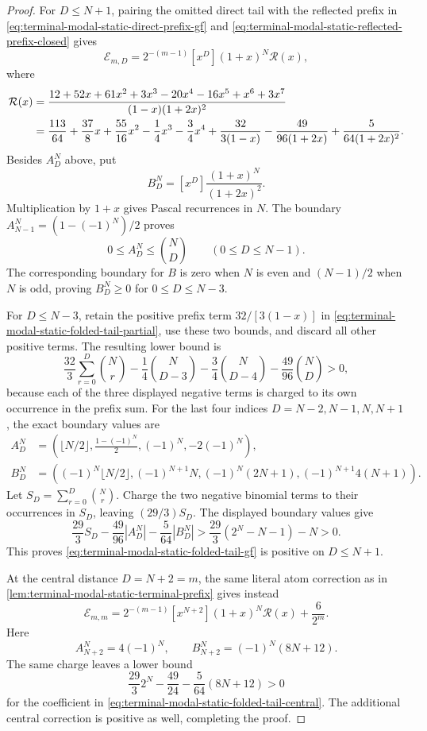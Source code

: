 \begin{proof}
For $D\le N+1$, pairing the omitted direct tail with the reflected prefix in
\eqref{eq:terminal-modal-static-direct-prefix-gf} and
\eqref{eq:terminal-modal-static-reflected-prefix-closed} gives
\begin{equation}
 \mathcal E_{m,D}=2^{-(m-1)}[x^D](1+x)^N\mathcal R(x),
 \label{eq:terminal-modal-static-folded-tail-gf}
\end{equation}
where
\begin{align}
 \mathcal R(x)
 &=\frac{12+52x+61x^2+3x^3-20x^4-16x^5+x^6+3x^7}
 {(1-x)(1+2x)^2}\notag\\
 &=\frac{113}{64}+\frac{37}{8}x+\frac{55}{16}x^2
 -\frac14x^3-\frac34x^4+\frac{32}{3(1-x)}
 -\frac{49}{96(1+2x)}+\frac{5}{64(1+2x)^2}.
 \label{eq:terminal-modal-static-folded-tail-partial}
\end{align}
Besides $A_D^N$ above, put
\[
 B_D^N=[x^D]\frac{(1+x)^N}{(1+2x)^2}.
\]
Multiplication by $1+x$ gives Pascal recurrences in $N$.
The boundary $A_{N-1}^N=(1-(-1)^N)/2$ proves
\[
 0\le A_D^N\le\binom ND\qquad(0\le D\le N-1).
\]
The corresponding boundary for $B$ is zero when $N$ is even and
$(N-1)/2$ when $N$ is odd, proving
$B_D^N\ge0$ for $0\le D\le N-3$.

For $D\le N-3$, retain the positive prefix term $32/[3(1-x)]$ in
\eqref{eq:terminal-modal-static-folded-tail-partial}, use these two bounds,
and discard all other positive terms.  The resulting lower bound is
\[
 \frac{32}{3}\sum_{r=0}^D\binom Nr
 -\frac14\binom N{D-3}-\frac34\binom N{D-4}
 -\frac{49}{96}\binom ND>0,
\]
because each of the three displayed negative terms is charged to its own
occurrence in the prefix sum.
For the last four indices $D=N-2,N-1,N,N+1$, the exact boundary values are
\begin{align*}
 A_D^N&=\left(\lfloor N/2\rfloor,
 \frac{1-(-1)^N}{2},(-1)^N,-2(-1)^N\right),\\
 B_D^N&=\left((-1)^N\lfloor N/2\rfloor,
 (-1)^{N+1}N,(-1)^N(2N+1),(-1)^{N+1}4(N+1)\right).
\end{align*}
Let $S_D=\sum_{r=0}^D\binom Nr$.  Charge the two negative binomial terms to
their occurrences in $S_D$, leaving $(29/3)S_D$.  The displayed boundary
values give
\[
 \frac{29}{3}S_D-\frac{49}{96}|A_D^N|-\frac5{64}|B_D^N|
 >\frac{29}{3}(2^N-N-1)-N>0.
\]
This proves
\eqref{eq:terminal-modal-static-folded-tail-gf} is positive on $D\le N+1$.

At the central distance $D=N+2=m$, the same literal atom correction as in
\cref{lem:terminal-modal-static-terminal-prefix} gives instead
\begin{equation}
 \mathcal E_{m,m}=2^{-(m-1)}[x^{N+2}](1+x)^N\mathcal R(x)
 +\frac6{2^m}.
 \label{eq:terminal-modal-static-folded-tail-central}
\end{equation}
Here
\[
 A_{N+2}^N=4(-1)^N,
 \qquad B_{N+2}^N=(-1)^N(8N+12).
\]
The same charge leaves a lower bound
\[
 \frac{29}{3}2^N-\frac{49}{24}-\frac5{64}(8N+12)>0
\]
for the coefficient in
\eqref{eq:terminal-modal-static-folded-tail-central}.  The additional central
correction is positive as well, completing the proof.
\end{proof}

